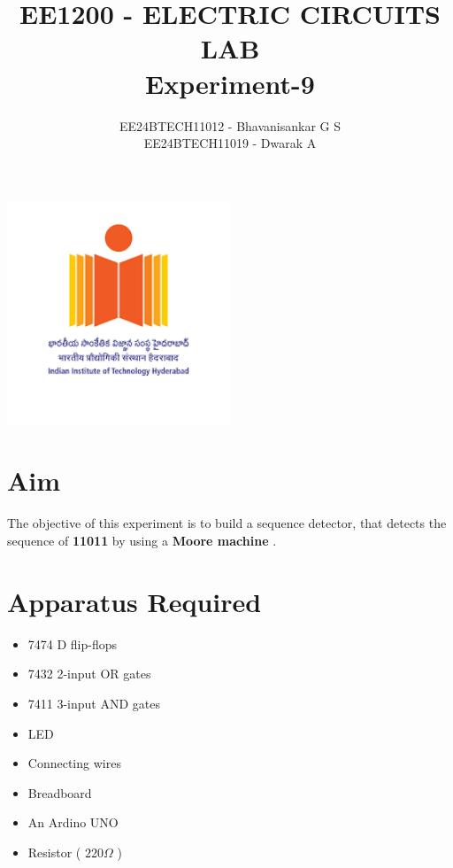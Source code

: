 \documentclass[a4paper,12pt]{article}
\begin{document}

\vspace{3cm}

\title{EE1200 - ELECTRIC CIRCUITS LAB \\ \textbf{Experiment-9} }
\author{EE24BTECH11012 - Bhavanisankar G S \\ EE24BTECH11019 - Dwarak A}
\begin{center}
    \includegraphics[width=0.5\textwidth]{IITH.png} \\ %
    \vspace{1cm} %
    \LARGE
    \end{center}
{\let\newpage\relax\maketitle}

\newpage
\tableofcontents
\newpage

\section{Aim}
The objective of this experiment is to build a sequence detector, that detects the sequence of \textbf{11011} by using a \textbf{Moore machine} .

\section{Apparatus Required}
\begin{itemize}
    \item 7474 D flip-flops
    \item 7432 2-input OR gates
    \item 7411 3-input AND gates
    \item LED
    \item Connecting wires
    \item Breadboard
    \item An Ardino UNO
    \item Resistor ( $ 220 \Omega$ )
\end{itemize}
\end{document}
